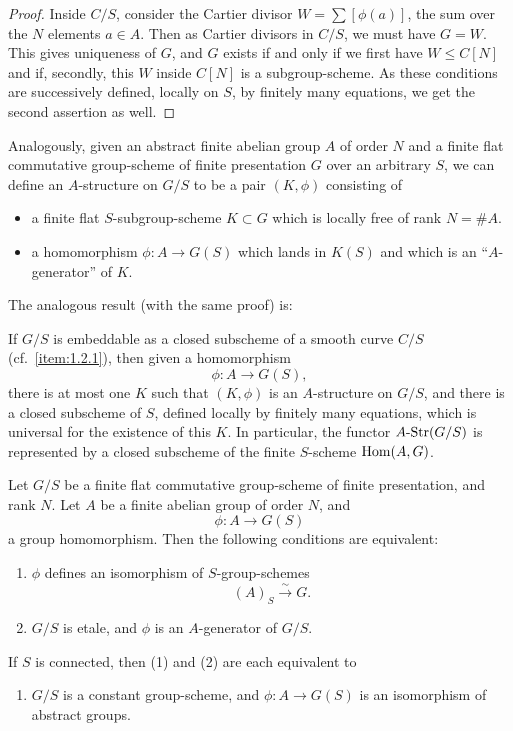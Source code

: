 \begin{proof}
Inside $C/S$, consider the Cartier divisor $W = \sum [\phi(a)]$, the sum over the $N$ elements $a \in A$. Then as Cartier divisors in $C/S$, we must have $G = W$. This gives uniqueness of $G$, and $G$ exists if and only if we first have $W \le C[N]$ and if, secondly, this $W$ inside $C[N]$ is a subgroup-scheme. As these conditions are successively defined, locally on $S$, by finitely many equations, we get the second assertion as well.
\end{proof}

\begin{remark}\label{rem:1.10.10}
Analogously, given an abstract finite abelian group $A$ of order $N$ and a finite flat commutative group-scheme of finite presentation $G$ over an arbitrary $S$, we can define an $A$-structure on $G/S$ to be a pair $(K, \phi)$ consisting of
\begin{itemize}
\item a finite flat $S$-subgroup-scheme $K \subset G$ which is locally free of rank $N = \# A$.
\item a homomorphism $\phi \colon A \to G(S)$ which lands in $K(S)$ and which is an ``$A$-generator'' of $K$.
\end{itemize}
The analogous result (with the same proof) is:
\end{remark}

\begin{lemma}\label{lem:1.10.11}
If $G/S$ is embeddable as a closed subscheme of a smooth curve $C/S$ (cf.~\ref{item:1.2.1}), then given a homomorphism
\[
\phi \colon A \longrightarrow G(S),
\]
there is at most one $K$ such that $(K, \phi)$ is an $A$-structure on $G/S$, and there is a closed subscheme of $S$, defined locally by finitely many equations, which is universal for the existence of this $K$. In particular, the functor $A\text{\rm -Str}(G/S)$ is represented by a closed subscheme of the finite $S$-scheme $\operatorname{Hom}(A, G)$.
\end{lemma}

\begin{proposition}\label{prop:1.10.12}
Let $G/S$ be a finite flat commutative group-scheme of finite presentation, and rank $N$. Let $A$ be a finite abelian group of order $N$, and
\[
\phi \colon A \longrightarrow G(S)
\]
a group homomorphism. Then the following conditions are equivalent:
\begin{enumerate}[(1)]
\item $\phi$ defines an isomorphism of $S$-group-schemes
\[
(A)_S \xrightarrow{\ \sim\ } G.
\]
\item $G/S$ is etale, and $\phi$ is an $A$-generator of $G/S$.
\end{enumerate}
If $S$ is connected, then (1) and (2) are each equivalent to
\begin{enumerate}[(3)]
\item $G/S$ is a constant group-scheme, and $\phi \colon A \to G(S)$ is an isomorphism of abstract groups.
\end{enumerate}
\end{proposition}

